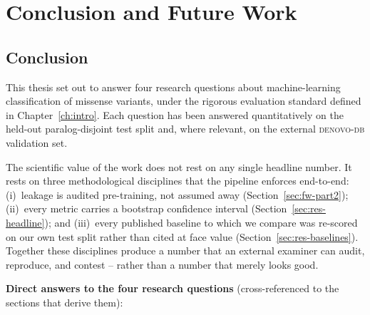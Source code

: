 \documentclass[11pt,a4paper,oneside]{report}
\begin{document}

\chapter{Conclusion and Future Work}
\label{ch:conclusion}

\section{Conclusion}
\label{sec:conc-main}

This thesis set out to answer four research questions about
machine-learning classification of missense variants, under
the rigorous evaluation standard defined in
Chapter~\ref{ch:intro}. Each question has been answered
quantitatively on the held-out paralog-disjoint test split
and, where relevant, on the external \textsc{denovo-db}
validation set.

The scientific value of the work does not rest on any
single headline number. It rests on three methodological
disciplines that the pipeline enforces end-to-end:
(i)~leakage is audited pre-training, not assumed away
(Section~\ref{sec:fw-part2}); (ii)~every metric carries a
bootstrap confidence interval
(Section~\ref{sec:res-headline}); and (iii)~every
published baseline to which we compare was re-scored on
our own test split rather than cited at face value
(Section~\ref{sec:res-baselines}). Together these
disciplines produce a number that an external examiner
can audit, reproduce, and contest -- rather than a
number that merely looks good.

\medskip\noindent\textbf{Direct answers to the four
research questions} (cross-referenced to the sections
that derive them):
\end{document}
